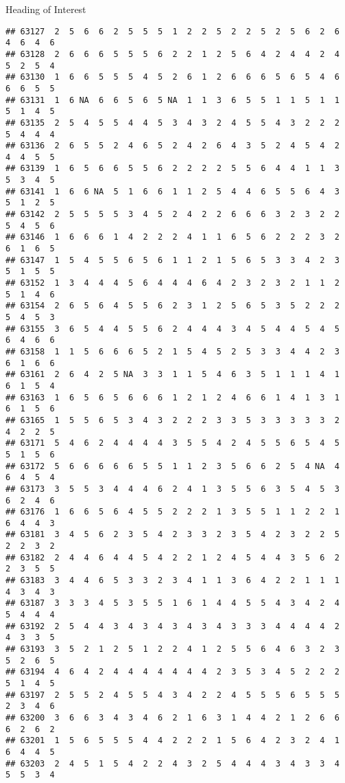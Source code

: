 \documentclass[
  ignorenonframetext,
]{beamer}
\begin{document}
\begin{frame}[fragile]{Heading of Interest}
\begin{verbatim}
## 63127  2  5  6  6  2  5  5  5  1  2  2  5  2  2  5  2  5  6  2  6  4  6  4  6
## 63128  2  6  6  6  5  5  5  6  2  2  1  2  5  6  4  2  4  4  2  4  5  2  5  4
## 63130  1  6  6  5  5  5  4  5  2  6  1  2  6  6  6  5  6  5  4  6  6  6  5  5
## 63131  1  6 NA  6  6  5  6  5 NA  1  1  3  6  5  5  1  1  5  1  1  5  1  4  5
## 63135  2  5  4  5  5  4  4  5  3  4  3  2  4  5  5  4  3  2  2  2  5  4  4  4
## 63136  2  6  5  5  2  4  6  5  2  4  2  6  4  3  5  2  4  5  4  2  4  4  5  5
## 63139  1  6  5  6  6  5  5  6  2  2  2  2  5  5  6  4  4  1  1  3  5  3  4  5
## 63141  1  6  6 NA  5  1  6  6  1  1  2  5  4  4  6  5  5  6  4  3  5  1  2  5
## 63142  2  5  5  5  5  3  4  5  2  4  2  2  6  6  6  3  2  3  2  2  5  4  5  6
## 63146  1  6  6  6  1  4  2  2  2  4  1  1  6  5  6  2  2  2  3  2  6  1  6  5
## 63147  1  5  4  5  5  6  5  6  1  1  2  1  5  6  5  3  3  4  2  3  5  1  5  5
## 63152  1  3  4  4  4  5  6  4  4  4  6  4  2  3  2  3  2  1  1  2  5  1  4  6
## 63154  2  6  5  6  4  5  5  6  2  3  1  2  5  6  5  3  5  2  2  2  5  4  5  3
## 63155  3  6  5  4  4  5  5  6  2  4  4  4  3  4  5  4  4  5  4  5  6  4  6  6
## 63158  1  1  5  6  6  6  5  2  1  5  4  5  2  5  3  3  4  4  2  3  6  1  6  6
## 63161  2  6  4  2  5 NA  3  3  1  1  5  4  6  3  5  1  1  1  4  1  6  1  5  4
## 63163  1  6  5  6  5  6  6  6  1  2  1  2  4  6  6  1  4  1  3  1  6  1  5  6
## 63165  1  5  5  6  5  3  4  3  2  2  2  3  3  5  3  3  3  3  3  2  4  2  2  5
## 63171  5  4  6  2  4  4  4  4  3  5  5  4  2  4  5  5  6  5  4  5  5  1  5  6
## 63172  5  6  6  6  6  6  5  5  1  1  2  3  5  6  6  2  5  4 NA  4  6  4  5  4
## 63173  3  5  5  3  4  4  4  6  2  4  1  3  5  5  6  3  5  4  5  3  6  2  4  6
## 63176  1  6  6  5  6  4  5  5  2  2  2  1  3  5  5  1  1  2  2  1  6  4  4  3
## 63181  3  4  5  6  2  3  5  4  2  3  3  2  3  5  4  2  3  2  2  5  2  2  3  2
## 63182  2  4  4  6  4  4  5  4  2  2  1  2  4  5  4  4  3  5  6  2  2  3  5  5
## 63183  3  4  4  6  5  3  3  2  3  4  1  1  3  6  4  2  2  1  1  1  4  3  4  3
## 63187  3  3  3  4  5  3  5  5  1  6  1  4  4  5  5  4  3  4  2  4  5  4  4  4
## 63192  2  5  4  4  3  4  3  4  3  4  3  4  3  3  3  4  4  4  4  2  4  3  3  5
## 63193  3  5  2  1  2  5  1  2  2  4  1  2  5  5  6  4  6  3  2  3  5  2  6  5
## 63194  4  6  4  2  4  4  4  4  4  4  4  2  3  5  3  4  5  2  2  2  5  1  4  5
## 63197  2  5  5  2  4  5  5  4  3  4  2  2  4  5  5  5  6  5  5  5  2  3  4  6
## 63200  3  6  6  3  4  3  4  6  2  1  6  3  1  4  4  2  1  2  6  6  6  2  6  2
## 63201  1  5  6  5  5  5  4  4  2  2  2  1  5  6  4  2  3  2  4  1  6  4  4  5
## 63203  2  4  5  1  5  4  2  2  4  3  2  5  4  4  4  3  4  3  3  4  5  5  3  4

\end{verbatim}
\end{frame}
\end{document}
